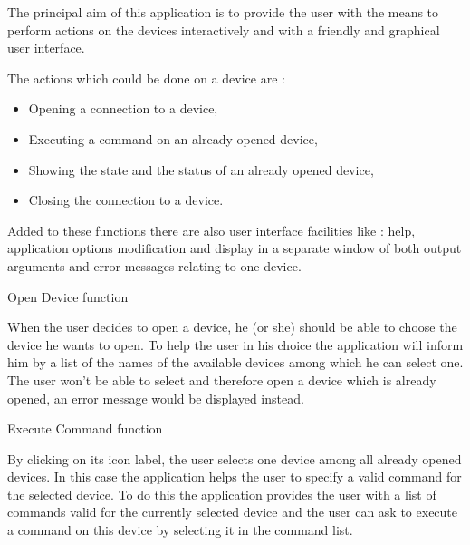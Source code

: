%
%
%
%
%
%
%
%
%
%
The principal aim of this application is to provide the user with the means to
perform actions on the devices interactively and with a friendly and graphical
user interface.

The actions which could be done on a device are :
\begin{itemize}
\item
Opening a connection to a device,
\item
Executing a command on an already opened device,
\item
Showing the state and the status of an already opened device,
\item
Closing the connection to a device.
\end{itemize}

Added to these functions there are also user interface facilities like : help, 
application options modification and display in a separate window of both 
output arguments and error messages relating to one device.

	{Open Device function}

When the user decides to open a device, he (or she) should be able to choose
the device he wants to open. To help the user in his choice the application
will inform him by a list of the names of the available devices among which he
can select one. The user won't be able to select and therefore open a device
which is already opened, an error message would be displayed instead.


	{Execute Command function}

By clicking on its icon label, the user selects one device among all already
opened devices. In this case the application helps the user to specify a  
valid command for the selected device. To do this the application
provides the user with a list of commands valid for the currently selected
device and the user can ask to execute a command on this device by selecting it
in the command list.

